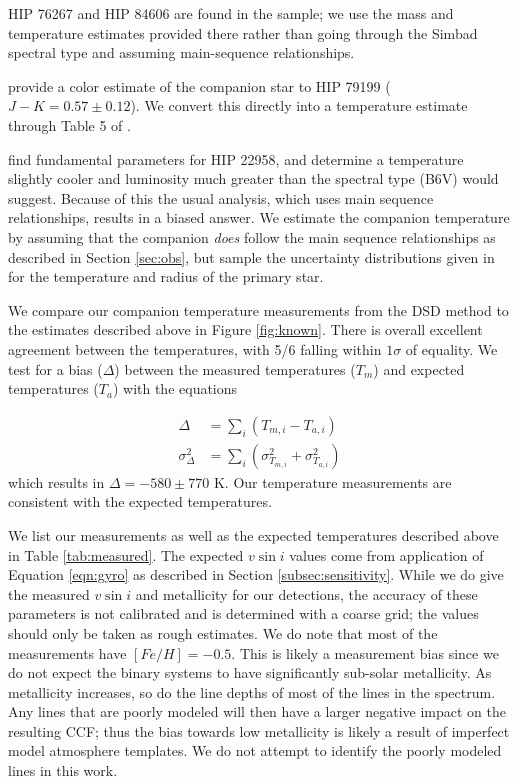 \documentclass{emulateapj}
\begin{document}
HIP 76267 and HIP 84606 are found in the \cite{David2015} sample; we use the mass and temperature estimates provided there rather than going through the Simbad spectral type and assuming main-sequence relationships.

\citet{Shatsky2002} provide a color estimate of the companion star to HIP 79199 ($J-K = 0.57 \pm 0.12$). We convert this directly into a temperature estimate through Table 5 of \citet{Pecaut2013}.

\citet{Zorec2012} find fundamental parameters for HIP 22958, and determine a temperature slightly cooler and luminosity much greater than the spectral type (B6V) would suggest. Because of this the usual analysis, which uses main sequence relationships, results in a biased answer. We estimate the companion temperature by assuming that the companion \emph{does} follow the main sequence relationships as described in Section \ref{sec:obs}, but sample the uncertainty distributions given in \citet{Zorec2012} for the temperature and radius of the primary star.

We compare our companion temperature measurements from the DSD method to the estimates described above in Figure \ref{fig:known}. There is overall excellent agreement between the temperatures, with 5/6 falling within $1 \sigma$ of equality. We test for a bias ($\Delta$) between the measured temperatures ($T_m$) and expected temperatures ($T_a$) with the equations

\begin{eqnarray}
\Delta &= \sum_i(T_{m,i} - T_{a,i}) \\
\sigma_{\Delta}^2 &= \sum_i (\sigma_{T_{m,i}}^2 + \sigma_{T_{a,i}}^2)
\end{eqnarray}
which results in $\Delta = -580 \pm 770$ K. Our temperature measurements are consistent with the expected temperatures.

We list our measurements as well as the expected temperatures described above in Table \ref{tab:measured}. The expected $v\sin{i}$ values come from application of Equation \ref{eqn:gyro} as described in Section \ref{subsec:sensitivity}. While we do give the measured $v\sin{i}$ and metallicity for our detections, the accuracy of these parameters is not calibrated and is determined with a coarse grid; the values should only be taken as rough estimates. We do note that most of the measurements have $[Fe/H] = -0.5$. This is likely a measurement bias since we do not expect the binary systems to have significantly sub-solar metallicity. As metallicity increases, so do the line depths of most of the lines in the spectrum. Any lines that are poorly modeled will then have a larger negative impact on the resulting CCF; thus the bias towards low metallicity is likely a result of imperfect model atmosphere templates. We do not attempt to identify the poorly modeled lines in this work.
\end{document}
